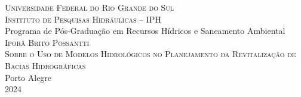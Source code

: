 \documentclass[./main.tex]{subfiles}
\begin{document}
\doublespacing %
\large
\newpage
\thispagestyle{empty}
\begin{center}
	\textsc{Universidade Federal do Rio Grande do Sul} \\	
	\textsc{Instituto de Pesquisas Hidráulicas -- IPH}\\		
	Programa de Pós-Graduação em Recursos Hídricos e Saneamento Ambiental\\
	\vspace{50mm}
	\textsc{Iporã Brito Possantti}\\
	\vspace{40mm}
	\textsc{Sobre o Uso de Modelos Hidrológicos no Planejamento da Revitalização de Bacias Hidrográficas}\\
	\vspace{100mm}
	Porto Alegre\\
	2024
\end{center}
\clearpage
\end{document}
